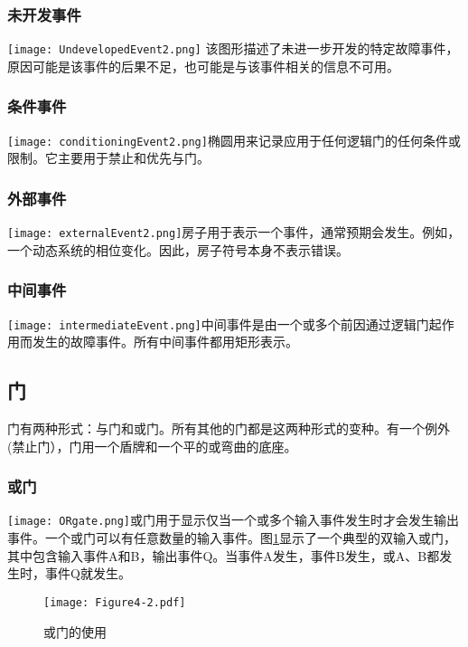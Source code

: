 \documentclass[cn,11pt,chinese]{elegantbook}
\begin{document}
\subsubsection{未开发事件} 

\texttt{[image: UndevelopedEvent2.png]}
该图形描述了未进一步开发的特定故障事件，原因可能是该事件的后果不足，也可能是与该事件相关的信息不可用。

\subsubsection{条件事件}

\texttt{[image: conditioningEvent2.png]}椭圆用来记录应用于任何逻辑门的任何条件或限制。它主要用于禁止和优先与门。

\subsubsection{外部事件}

\texttt{[image: externalEvent2.png]}房子用于表示一个事件，通常预期会发生。例如，一个动态系统的相位变化。因此，房子符号本身不表示错误。


\subsubsection{中间事件}

\texttt{[image: intermediateEvent.png]}中间事件是由一个或多个前因通过逻辑门起作用而发生的故障事件。所有中间事件都用矩形表示。

\subsection{门}

门有两种形式：与门和或门。所有其他的门都是这两种形式的变种。有一个例外(禁止门），门用一个盾牌和一个平的或弯曲的底座。

\subsubsection{或门}

\texttt{[image: ORgate.png]}或门用于显示仅当一个或多个输入事件发生时才会发生输出事件。一个或门可以有任意数量的输入事件。图\ref{fig:fig4_2}显示了一个典型的双输入或门，其中包含输入事件A和B，输出事件Q。当事件A发生，事件B发生，或A、B都发生时，事件Q就发生。

\begin{figure}[h]
	\centering
	\texttt{[image: Figure4-2.pdf]}
	\caption{或门的使用}\label{fig:fig4_2}
\end{figure}
\end{document}
